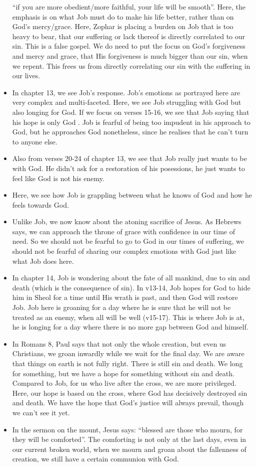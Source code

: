 \begin{itemize}
{  ``if you are more obedient/more faithful, your life will be smooth''. Here,
  the emphasis is on what Job must do to make his life better, rather than on
  God's mercy/grace. Here, Zophar is placing a burden on Job that is too
  heavy to bear, that our suffering or lack thereof is directly correlated to
  our sin. This is a false gospel. We do need to put the focus on God's
  forgiveness and mercy and grace, that His forgiveness is much bigger than
  our sin, when we repent. This frees us from directly correlating our sin
  with the suffering in our lives. }
  \item{In chapter 13, we see Job's response. Job's emotions as portrayed
  here are very complex and multi-faceted. Here, we see Job struggling with
  God but also longing for God. If we focus on verses 15-16, we see that Job
  saying that his hope is only God . Job is fearful of being too impudent in his approach to God, but he approaches God nonetheless, since he realises that he can't turn to anyone else.}
  \item{Also from verses 20-24 of chapter 13, we see that Job really just wants to be with God. He didn't ask for a restoration of his posessions, he just wants to feel like God is not his enemy.}
  \item{Here, we see how Job is grappling between what he knows of God and how he feels towards God. }
  \item{Unlike Job, we now know about the atoning sacrifice of Jesus. As
  Hebrews says, we can approach the throne of grace with confidence in our
  time of need. So we should not be fearful to go to God in our times of
  suffering, we should not be fearful of sharing our complex emotions with
  God just like what Job does here.}
  \item{In chapter 14, Job is wondering about the fate of all mankind, due to
  sin and death (which is the consequence of sin). In v13-14, Job hopes for
  God to hide him in Sheol for a time until His wrath is past, and then God
  will restore Job. Job here is groaning for a day where he is sure that he
  will not be treated as an enemy, when all will be well (v15-17). This is
  where Job is at, he is longing for a day where there is no more gap between
  God and himself.}
  \item{In Romans 8, Paul says that not only the whole creation, but even us
  Christians, we groan inwardly while we wait for the final day. We are aware
  that things on earth is not fully right. There is still sin and death. We
  long for something, but we have a hope for something without sin and death.
  Compared to Job, for us who live after the cross, we are more privileged.
  Here, our hope is based on the cross, where God has decisively destroyed
  sin and death. We have the hope that God's justice will always prevail,
  though we can't see it yet.}
  \item{In the sermon on the mount, Jesus says: ``blessed are those who mourn, for they will be comforted''. The comforting is not only at the last days, even in our current broken world, when we mourn and groan about the fallenness of creation, we still have a certain communion with God.}
\end{itemize}